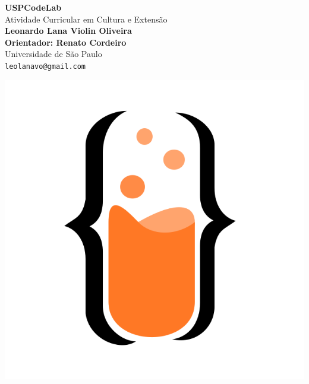 \documentclass[a0,portrait]{a0poster}
\begin{document}


\begin{minipage}[b]{0.75\linewidth}
\veryHuge \color{DeepOrange} \textbf{USPCodeLab} \color{Black}\\ [1cm]%
\Huge Atividade Curricular em Cultura e Extensão\\[2cm] %
\huge \textbf{Leonardo Lana Violin Oliveira}\\[0.5cm] %
\textbf{Orientador: Renato Cordeiro}\\[0.5cm] %
\huge Universidade de São Paulo\\[0.4cm] %
\Large \texttt{leolanavo@gmail.com} \\
\end{minipage}
%
\begin{minipage}[b]{0.25\linewidth}
\includegraphics[width=20cm]{UCL-Logo-660px.png}\\
\end{minipage}
\end{document}
